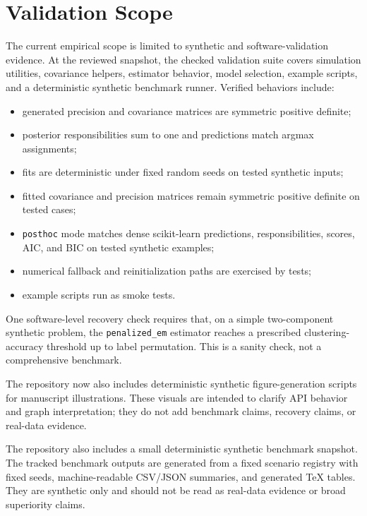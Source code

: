\documentclass[10pt]{article}
\begin{document}
\section{Validation Scope}

The current empirical scope is limited to synthetic and software-validation
evidence. At the reviewed snapshot, the checked validation suite covers
simulation utilities, covariance helpers, estimator behavior, model selection,
example scripts, and a deterministic synthetic benchmark runner. Verified
behaviors include:
\begin{itemize}[leftmargin=1.5em]
\item generated precision and covariance matrices are symmetric positive
definite;
\item posterior responsibilities sum to one and predictions match argmax
assignments;
\item fits are deterministic under fixed random seeds on tested synthetic
inputs;
\item fitted covariance and precision matrices remain symmetric positive
definite on tested cases;
\item \texttt{posthoc} mode matches dense scikit-learn predictions,
responsibilities, scores, AIC, and BIC on tested synthetic examples;
\item numerical fallback and reinitialization paths are exercised by tests;
\item example scripts run as smoke tests.
\end{itemize}

One software-level recovery check requires that, on a simple two-component
synthetic problem, the \texttt{penalized\_em} estimator reaches a prescribed
clustering-accuracy threshold up to label permutation. This is a sanity check,
not a comprehensive benchmark.

The repository now also includes deterministic synthetic figure-generation
scripts for manuscript illustrations. These visuals are intended to clarify API
behavior and graph interpretation; they do not add benchmark claims, recovery
claims, or real-data evidence.

The repository also includes a small deterministic synthetic benchmark
snapshot. The tracked benchmark outputs are generated from a fixed scenario
registry with fixed seeds, machine-readable CSV/JSON summaries, and generated
TeX tables. They are synthetic only and should not be read as real-data
evidence or broad superiority claims.


\end{document}

